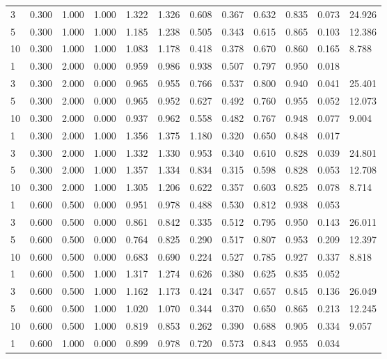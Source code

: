 {\begin{longtable}{llllllllllll}
3 & 0.300 & 1.000 & 1.000 & 1.322 & 1.326 & 0.608 & 0.367 & 0.632 & 0.835 & 0.073 & 24.926 \\
5 & 0.300 & 1.000 & 1.000 & 1.185 & 1.238 & 0.505 & 0.343 & 0.615 & 0.865 & 0.103 & 12.386 \\
10 & 0.300 & 1.000 & 1.000 & 1.083 & 1.178 & 0.418 & 0.378 & 0.670 & 0.860 & 0.165 & 8.788 \\
1 & 0.300 & 2.000 & 0.000 & 0.959 & 0.986 & 0.938 & 0.507 & 0.797 & 0.950 & 0.018 &  \\
3 & 0.300 & 2.000 & 0.000 & 0.965 & 0.955 & 0.766 & 0.537 & 0.800 & 0.940 & 0.041 & 25.401 \\
5 & 0.300 & 2.000 & 0.000 & 0.965 & 0.952 & 0.627 & 0.492 & 0.760 & 0.955 & 0.052 & 12.073 \\
10 & 0.300 & 2.000 & 0.000 & 0.937 & 0.962 & 0.558 & 0.482 & 0.767 & 0.948 & 0.077 & 9.004 \\
1 & 0.300 & 2.000 & 1.000 & 1.356 & 1.375 & 1.180 & 0.320 & 0.650 & 0.848 & 0.017 &  \\
3 & 0.300 & 2.000 & 1.000 & 1.332 & 1.330 & 0.953 & 0.340 & 0.610 & 0.828 & 0.039 & 24.801 \\
5 & 0.300 & 2.000 & 1.000 & 1.357 & 1.334 & 0.834 & 0.315 & 0.598 & 0.828 & 0.053 & 12.708 \\
10 & 0.300 & 2.000 & 1.000 & 1.305 & 1.206 & 0.622 & 0.357 & 0.603 & 0.825 & 0.078 & 8.714 \\
1 & 0.600 & 0.500 & 0.000 & 0.951 & 0.978 & 0.488 & 0.530 & 0.812 & 0.938 & 0.053 &  \\
3 & 0.600 & 0.500 & 0.000 & 0.861 & 0.842 & 0.335 & 0.512 & 0.795 & 0.950 & 0.143 & 26.011 \\
5 & 0.600 & 0.500 & 0.000 & 0.764 & 0.825 & 0.290 & 0.517 & 0.807 & 0.953 & 0.209 & 12.397 \\
10 & 0.600 & 0.500 & 0.000 & 0.683 & 0.690 & 0.224 & 0.527 & 0.785 & 0.927 & 0.337 & 8.818 \\
1 & 0.600 & 0.500 & 1.000 & 1.317 & 1.274 & 0.626 & 0.380 & 0.625 & 0.835 & 0.052 &  \\
3 & 0.600 & 0.500 & 1.000 & 1.162 & 1.173 & 0.424 & 0.347 & 0.657 & 0.845 & 0.136 & 26.049 \\
5 & 0.600 & 0.500 & 1.000 & 1.020 & 1.070 & 0.344 & 0.370 & 0.650 & 0.865 & 0.213 & 12.245 \\
10 & 0.600 & 0.500 & 1.000 & 0.819 & 0.853 & 0.262 & 0.390 & 0.688 & 0.905 & 0.334 & 9.057 \\
1 & 0.600 & 1.000 & 0.000 & 0.899 & 0.978 & 0.720 & 0.573 & 0.843 & 0.955 & 0.034 &  \\

\end{longtable}}
